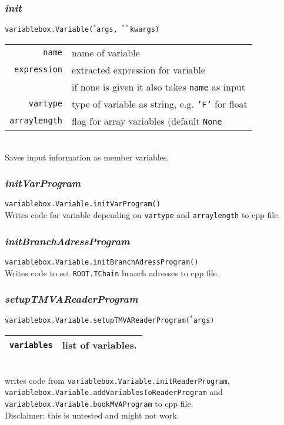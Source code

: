 \documentclass[12pt, a4paper]{article}
\newcommand{\args}{$^*$args}
\newcommand{\kwargs}{$^{**}$kwargs}
\begin{document}
\subsubsection{\textit{init}}
\texttt{variablebox.Variable(\args, \kwargs)}\\
\begin{tabular}{r|l}
\hline
\texttt{name}			& name of variable\\
\texttt{expression}		& extracted expression for variable \\
						& if none is given it also takes \texttt{name} as input\\
\texttt{vartype}		& type of variable as string, e.g. \texttt{'F'} for float\\
\texttt{arraylength}	& flag for array variables (default \texttt{None}\\
\hline
\end{tabular}
\\
Saves input information as member variables.

\subsubsection{\textit{initVarProgram}}
\texttt{variablebox.Variable.initVarProgram()}\\
Writes code for variable depending on \texttt{vartype} and \texttt{arraylength} to cpp file.

\subsubsection{\textit{initBranchAdressProgram}}
\texttt{variablebox.Variable.initBranchAdressProgram()}\\
Writes code to set \texttt{ROOT.TChain} branch adresses to cpp file.

\subsubsection{\textit{setupTMVAReaderProgram}}
\texttt{variablebox.Variable.setupTMVAReaderProgram(\args)}\\
\begin{tabular}{r|l}
\hline
\texttt{variables}	& list of variables.\\
\hline
\end{tabular}
\\
writes code from \texttt{variablebox.Variable.initReaderProgram}, \texttt{variablebox.Variable.addVariablesToReaderProgram} and \texttt{variablebox.Variable.bookMVAProgram} to cpp file.\\
Disclaimer: this is untested and might not work.
\end{document}
